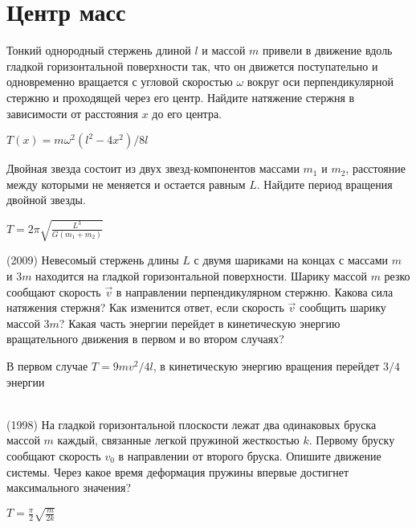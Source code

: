 \section{Центр масс}
\begin{ex}
Тонкий однородный стержень длиной $l$ и массой $m$ привели в движение вдоль гладкой горизонтальной поверхности так, что он движется поступательно и одновременно вращается с угловой скоростью $\omega$ вокруг оси перпендикулярной стержню и проходящей через его центр. Найдите натяжение стержня в зависимости от расстояния $x$ до его центра.
\begin{ans}
$T(x) = m \omega^2 \left( l^2 - 4x^2 \right)/8l$
\end{ans}
\end{ex}

\begin{ex}
Двойная звезда состоит из двух звезд-компонентов массами $m_1$ и $m_2$, расстояние между которыми не меняется и остается равным $L$. Найдите период вращения двойной звезды.
\begin{ans}
$T = 2 \pi \sqrt{\frac{L^3}{G(m_1+m_2)}}$ 
\end{ans}
\end{ex}

\begin{ex}
(2009) Невесомый стержень длины $L$ с двумя шариками на концах с массами $m$ и $3m$ находится на гладкой горизонтальной поверхности. Шарику массой $m$ резко сообщают скорость $\vec v$ в направлении перпендикулярном стержню. Какова сила натяжения стержня? Как изменится ответ, если скорость $\vec v$ сообщить шарику массой $3m$? Какая часть энергии перейдет в кинетическую энергию вращательного движения в первом и во втором случаях?
\begin{ans}
В первом случае $T = 9mv^2 / 4l$, в кинетическую энергию вращения перейдет $3/4$ энергии
\end{ans}
\end{ex}

\begin{ex}
\hspace{0pt} \\
(1998) На гладкой горизонтальной плоскости лежат два одинаковых бруска массой $m$ каждый, связанные легкой пружиной жесткостью $k$. Первому бруску сообщают скорость $v_0$ в направлении от второго бруска. Опишите движение системы. Через какое время деформация пружины впервые достигнет максимального значения? 
\begin{center}

\end{center}
\begin{ans}
$T = \frac{\pi}{2}\sqrt{\frac{m}{2k}}$
\end{ans}
\end{ex}


